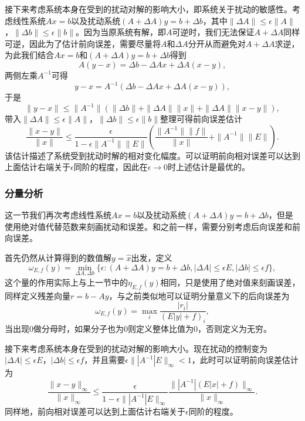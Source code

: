 \documentclass[a4paper,10pt]{ctexart}
\begin{document}
接下来考虑系统本身在受到的扰动对解的影响大小，即系统关于扰动的敏感性。考虑线性系统$ Ax=b $以及扰动系统$ (A+\Delta A)y = b + \Delta b $，其中$ \| \Delta A \| \leqslant \epsilon \| A \| $，$ \| \Delta b \| \leqslant \epsilon \| b \| $。因为当原系统有解，即$ A $可逆时，我们无法保证$ A+\Delta A $同样可逆，因此为了估计前向误差，需要尽量将$ A $和$ \Delta A $分开从而避免对$ A+\Delta A $求逆，为此我们结合$ Ax=b $和$ (A+\Delta A)y = b + \Delta b $得到
\[
    A(y-x) = \Delta b - \Delta A x + \Delta A (x-y),
\]
两侧左乘$ A^{-1} $可得
\[
    y-x = A^{-1}(\Delta b - \Delta A x + \Delta A (x-y)),
\]
于是
\[
    \| y-x \| \leqslant \| A^{-1} \| (\| \Delta b \| + \| \Delta A \| \| x \| + \| \Delta A \| \| x-y \|),  
\]
带入$ \| \Delta A \| \leqslant \epsilon \| A \| $，$ \| \Delta b \| \leqslant \epsilon \| b \| $整理可得前向误差估计
\begin{equation}\label{eq:normwise_forward_error}
    \frac{\| x-y \|}{\| x \| } \leqslant \frac{\epsilon}{1-\epsilon \| A^{-1} \| \| E \|} \left( \frac{\| A^{-1} \| \| f \|}{\| x \|} + \| A^{-1} \| \| E \| \right).
\end{equation}
该估计描述了系统受到扰动时解的相对变化幅度。可以证明前向相对误差可以达到上面估计右端关于$ \epsilon $同阶的程度，因此在$ \epsilon\to 0 $时上述估计是最优的。

\subsubsection{分量分析}\label{sec:component_analysis}
这一节我们再次考虑线性系统$ Ax=b $以及扰动系统$ (A+\Delta A)y = b + \Delta b $，但是使用绝对值代替范数来刻画扰动和误差。和之前一样，需要分别考虑后向误差和前向误差。

首先仍然从计算得到的数值解$ y=\hat{x} $出发，定义
\begin{equation}
    \omega_{E,f}(y) = \min_{\Delta A, \Delta b}\{ \epsilon: (A+\Delta A)y = b+\Delta b, | \Delta A | \leqslant \epsilon E , | \Delta b | \leqslant \epsilon f \},
\end{equation}
这个量的作用实际上与上一节中的$ \eta_{E,f}(y) $相同，只是使用了绝对值来刻画误差，同样定义残差向量$ r = b - A y $，与之前类似地可以证明分量意义下的后向误差为
\begin{equation}
    \omega_{E,f}(y) = \max_i \frac{| r_i |}{(E | y | + f)_i},
\end{equation}
当出现0做分母时，如果分子也为0则定义整体比值为0，否则定义为无穷。

接下来考虑系统本身在受到的扰动对解的影响大小。现在扰动的控制变为$ | \Delta A | \leqslant \epsilon E $，$ | \Delta b | \leqslant \epsilon f $，并且需要$ \epsilon\| |A^{-1}|E \|_\infty < 1 $，此时可以证明前向误差估计为
\begin{equation}\label{eq:componentwise_forward_error}
    \frac{\| x-y \|_\infty}{\| x \|_\infty} \leqslant \frac{\epsilon}{1-\epsilon \| |A^{-1}|E \|_\infty}  \frac{\| |A^{-1}|(E|x|+f) \|_\infty}{\| x \|_\infty }.
\end{equation}
同样地，前向相对误差可以达到上面估计右端关于$ \epsilon $同阶的程度。
\end{document}
